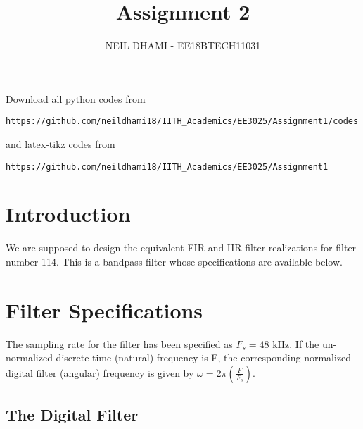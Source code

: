 \documentclass[journal,12pt,twocolumn]{IEEEtran}
\begin{document}
     \def\rightbox#1{\makebox[0in][r]{#1}}
     \def\centbox#1{\makebox[0in]{#1}}
     \def\topbox#1{\raisebox{-\baselineskip}[0in][0in]{#1}}
     \def\midbox#1{\raisebox{-0.5\baselineskip}[0in][0in]{#1}}
\vspace{3cm}
\title{Assignment 2}
\author{NEIL DHAMI - EE18BTECH11031}
\maketitle
\newpage
\bigskip
\renewcommand{\thefigure}{\theenumi}
\renewcommand{\thetable}{\theenumi}
Download all python codes from 
\begin{lstlisting}
https://github.com/neildhami18/IITH_Academics/EE3025/Assignment1/codes
\end{lstlisting}
%
and latex-tikz codes from 
%
\begin{lstlisting}
https://github.com/neildhami18/IITH_Academics/EE3025/Assignment1
\end{lstlisting}

\section{Introduction}
We are supposed to design the equivalent FIR and IIR filter realizations for filter number 114.  
This is a bandpass filter whose specifications are available below.

\section{Filter Specifications}
The sampling rate for the filter has been specified as $F_s =  48$ kHz.	If the un-normalized  discrete-time (natural) frequency is F, the corresponding normalized digital filter (angular) frequency is given by $\omega = 2\pi
\left(\frac{F}{F_s}\right)$.

\subsection{The Digital Filter}
\end{document}
